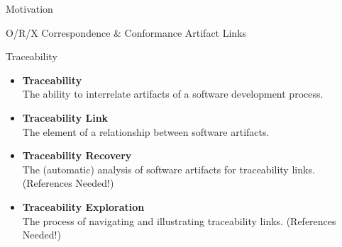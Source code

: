 \documentclass{beamer}
\begin{document}
\begin{frame}[allowframebreaks]{Motivation}
\begin{center}
\newline
O/R/X Correspondence \& Conformance Artifact Links
\end{center}
\end{frame}

\begin{frame}{Traceability}
\begin{itemize}

\item
\textbf{Traceability}
\\The ability to interrelate artifacts of a software development process.\cite{Winkler:2010:STR:1861285.1861287}\cite{IEEEGlossary}

\item
\textbf{Traceability Link}
\\The element of a relationship between software artifacts.\cite{Winkler:2010:STR:1861285.1861287}

\item
\textbf{Traceability Recovery}
\\The (automatic) analysis of software artifacts for traceability links.
(References Needed!)

\item
\textbf{Traceability Exploration}
\\The process of navigating and illustrating traceability links.
(References Needed!)

\end{itemize}
\end{frame}
\end{document}
